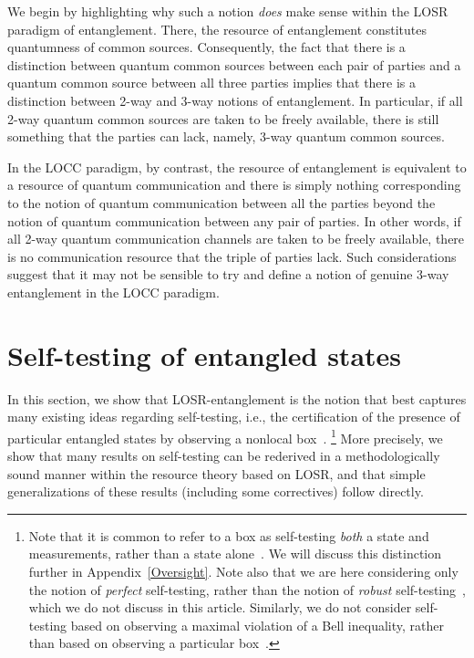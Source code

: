 \documentclass[prx,11pt,letterpaper,twocolumn,accepted=2023-11-27]{quantumarticle}
\theoremstyle{plain}
\theoremstyle{definition}
\begin{document}
We begin by highlighting why such a notion {\em does} make sense within the LOSR paradigm of entanglement.  There, 
the resource of entanglement constitutes quantumness of common sources.
Consequently, the fact that there is a distinction between quantum common sources between each pair of parties
 and a quantum common source between 
  all three parties implies that there is a distinction between 2-way and 3-way notions of entanglement.  In particular, if all 2-way quantum common sources
   are taken to be freely available, there is still something that the parties can lack, namely, 3-way quantum common sources.

 In the LOCC paradigm, by contrast, the resource of entanglement is equivalent to a resource of quantum communication 
  and there is simply nothing corresponding to the notion of quantum communication between all the parties beyond the notion of quantum communication between any pair of parties.  In other words, if all 2-way quantum communication channels are taken to be freely available, there is no communication resource that the triple of parties lack.  Such considerations suggest that it may not be sensible to try and define a notion of genuine 3-way entanglement in the LOCC paradigm.

\section{Self-testing of entangled states}\label{sec:selftesting}

In this section, we show that LOSR-entanglement is the notion that best captures many existing ideas regarding self-testing,
  i.e., the certification of the presence of particular entangled states by observing a nonlocal box~\cite{mayers1998quantum,mayers2003self,vsupic2020self,Scarani2019}.
  \footnote{
  Note that it is common to refer to a box as self-testing {\em both} a state and measurements, rather than a state alone~\cite{vsupic2020self,JedWeak2020,ScaraniStateSelfTest2009}.  We will discuss this distinction further in Appendix~\ref{Oversight}. Note also that we are here considering only the notion of {\em perfect} self-testing, rather than the notion of {\em robust} self-testing~\cite{McKague2012,Yang2013selftesting,vsupic2020self,Scarani2019}, which we do not discuss in this article.  Similarly, we do not consider self-testing based on observing a maximal violation of a Bell inequality, rather than based on observing a particular box~\cite{ScaraniStateSelfTest2009,Bamps2015selftesting,Baccari2020}.} 
  More precisely, we show that many results on self-testing can be rederived in a methodologically sound manner within the resource theory based on LOSR, and that simple generalizations of these results (including some correctives) follow directly.
\end{document}
